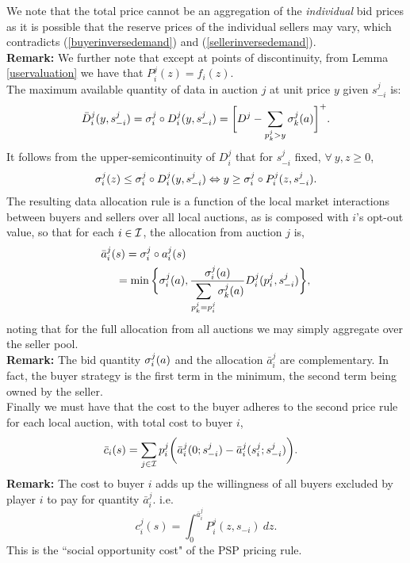 We note that
the total price cannot be an aggregation of the
\emph{individual} bid prices as it is possible that the reserve prices
of the individual sellers may vary, which contradicts
(\ref{buyerinversedemand}) and (\ref{sellerinversedemand}).\\
\textbf{Remark:} We further note that except at points of discontinuity, from
Lemma \ref{uservaluation} we have that $P_i^j(z) = f_i(z)$. \\
\fi
The maximum available quantity of data in auction
$j$ at unit price $y$ given $s_{-i}^j$ is: 
\begin{align}
\begin{split}\label{datacomposed}
    \bar{D}_i^j(y,s_{-i}^j) = \sigma_i^j \circ D_i^j( y,s_{-i}^j)
    = \bigg\lbrack D^j - \sum_{p_k^j> y} \sigma_k^j(a)\bigg\rbrack^+.
\end{split}
\end{align}
It follows from the upper-semicontinuity of $D_i^j$ that for $s_{-i}^j$ fixed, $\forall \ y,z \ge 0$,
\begin{equation}\label{dtop}
    \sigma_i^j(z) \le \sigma_i^j \circ D_i^j(y,s_{-i}^j) \Leftrightarrow y \ge \sigma_i^j
\circ P_i^j(z,s_{-i}^j).
\end{equation}
The resulting data allocation rule is a function of the local market
interactions between buyers and sellers over all local auctions, as is composed with $i$'s opt-out value, so that for each $i \in \mathcal{I}$, the
allocation from auction $j$ is,
\begin{align}\label{dataallocation}
\begin{split}
    \bar{a}_i^j(&s) = \sigma_i^j \circ a_i^j(s) \\
    &= \min\bigg\lbrace \sigma_i^j(a), 
    \frac{\sigma_i^j(a)}{\displaystyle\sum_{p_k^j= p_i^j}\sigma_k^j(a)} 
D_i^j(p_i^j,s_{-i}^j)\bigg\rbrace,
\end{split}
\end{align}
noting that for the full allocation from all auctions we may simply aggregate
over the seller pool. \\
\textbf{Remark:} The bid quantity $\sigma_i^j(a)$ and the allocation $\bar{a}_i^j$
are complementary. In fact, the buyer strategy is the first term in the
minimum, the second term being owned by the seller. \\
Finally we must have that the cost to the buyer adheres to the second price
rule for each local auction, with total cost to buyer $i$,
\begin{align}\label{datacost}
\begin{split}
    \bar{c}_i(s) &= \displaystyle\sum_{j\in\mathcal{I}} 
    p_i^j \bigg(\bar{a}_i^j(0; s_{-i}^j)
    -\bar{a}_i^j(s_i^j;s_{-i}^j)\bigg).
\end{split}
\end{align}
\textbf{Remark:} The cost to buyer $i$ adds up the willingness
of all buyers excluded by player $i$ to pay for quantity $\bar{a}_i^j$. i.e.
$$
    c_i^j(s) = \displaystyle\int_0^{\bar{a}_i^j} P_i^j(z, s_{-i}) \ dz.
$$
This is the ``social opportunity cost" of the PSP pricing rule.

